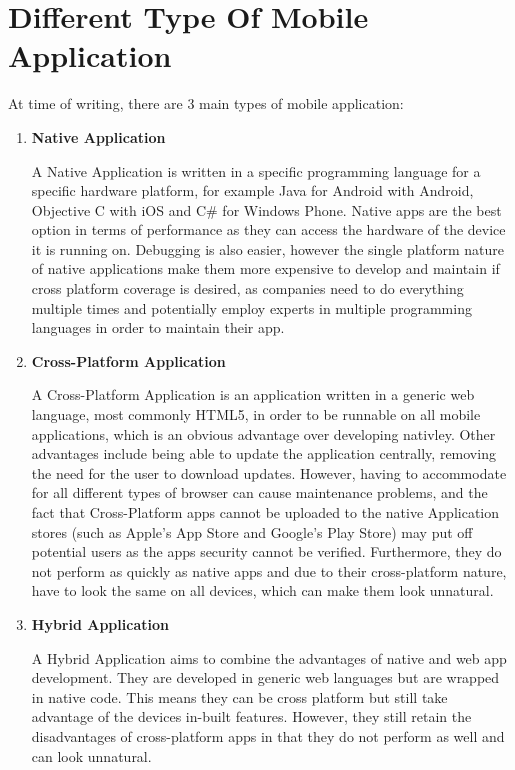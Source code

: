 \documentclass[ %
                    author={Jonathan Rankin},
                supervisor={Dr. David May, Dr. Ian Holyer},
                    degree={MEng},
                     title={CodeTouch},
                  subtitle={A Revolutionary Way To Program Real Code On Touch Screen Devices},
                      type={enterprise},
                      year={2015 } ]{dissertation}
\begin{document}
\section{Different Type Of Mobile Application }\label{sec:ApTypes}
At time of writing, there are 3 main types of mobile application:
\begin{enumerate}
\item \textbf{Native Application}
\begin{itemize}
A Native Application is written in a specific programming language for a specific hardware platform, for example Java for Android with Android, Objective C with iOS and C# for Windows Phone. Native apps are the best option in terms of performance as they can access the hardware of the device it is running on. Debugging is also easier, however the single platform nature of native applications make them more expensive to develop and maintain if cross platform coverage is desired, as companies need to do everything multiple times and potentially employ experts in multiple programming languages in order to maintain their app. 
\end{itemize}


\item \textbf{Cross-Platform Application}
\begin{itemize}
A Cross-Platform Application is an application written in a generic web language, most commonly HTML5, in order to be runnable on all mobile applications, which is an obvious advantage over developing nativley.  Other advantages include being able to update the application centrally, removing the need for the user to download updates.  However, having to accommodate for all different types of browser can cause maintenance problems, and the fact that Cross-Platform apps cannot be uploaded to the native Application stores (such as Apple's App Store and Google's Play Store) may put off potential users as the apps security cannot be verified. Furthermore, they do not perform as quickly as native apps and due to their cross-platform nature, have to look the same on all devices, which can make them look unnatural. 
\end{itemize}
\item \textbf {Hybrid Application}
\begin{itemize}
A Hybrid Application aims to  combine the advantages of native and web app development. They are developed in generic web languages but are wrapped in native code. This means they can be cross platform but still take advantage of the devices in-built features. However, they still retain the disadvantages of cross-platform apps in that they do not perform as well and can look unnatural.
\end{itemize}
\end{enumerate}
\end{document}
